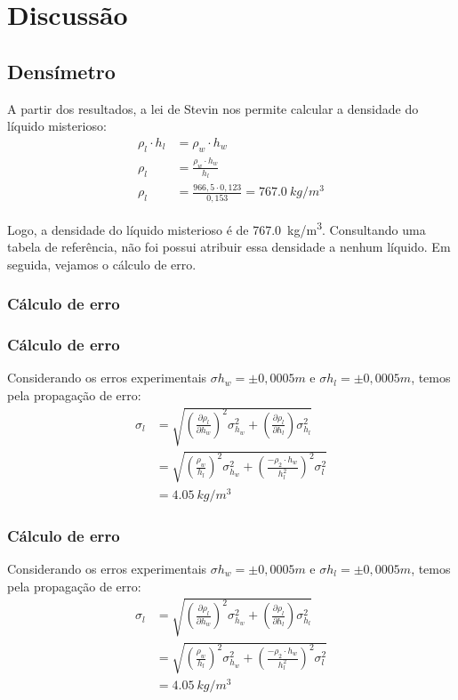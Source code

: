 \section{Discussão}
\subsection{Densímetro}

A partir dos resultados, a lei de Stevin nos permite calcular a densidade do
líquido misterioso:
\begin{align*}
    \rho_l \cdot h_l &= \rho_w \cdot h_w\\
    \rho_l &= \frac{\rho_w \cdot h_w}{h_l}\\
    \rho_l &= \frac{966,5 \cdot 0,123}{0,153} = \qty{767,0}{kg/m^3} 
\end{align*}

Logo, a densidade do líquido misterioso é de \qty{767,0}{kg/m^3}. Consultando
uma tabela de referência, não foi possui atribuir essa densidade a nenhum
líquido. Em seguida, vejamos o cálculo de erro.

\subsubsection{Cálculo de erro}


\subsubsection{Cálculo de erro}
Considerando os erros experimentais \(\sigma h_w = \pm0,0005 m\) e \(\sigma h_l = \pm 0,0005 m\), temos pela propagação de erro:
\begin{align*}
    \sigma_l &= \sqrt{\left(\frac{\partial\rho_l}{\partial h_w}\right)^2\sigma_{h_w}^2 + \left(\frac{\partial\rho_l}{\partial h_l}\right)\sigma_{h_l}^2}\\
    &= \sqrt{\left(\frac{\rho_w}{h_l}\right)^2 \sigma_{h_w}^2 + \left(\frac{-\rho_2 \cdot h_w}{h_l^2}\right)^2\sigma_l^2}\\
    &= \qty{4,05}{kg/m^3}
\end{align*}


\subsubsection{Cálculo de erro}
Considerando os erros experimentais \(\sigma h_w = \pm0,0005 m\) e \(\sigma h_l = \pm 0,0005 m\), temos pela propagação de erro:
\begin{align*}
    \sigma_l &= \sqrt{\left(\frac{\partial\rho_l}{\partial h_w}\right)^2\sigma_{h_w}^2 + \left(\frac{\partial\rho_l}{\partial h_l}\right)\sigma_{h_l}^2}\\
    &= \sqrt{\left(\frac{\rho_w}{h_l}\right)^2 \sigma_{h_w}^2 + \left(\frac{-\rho_2 \cdot h_w}{h_l^2}\right)^2\sigma_l^2}\\
    &= \qty{4,05}{kg/m^3}
\end{align*}


